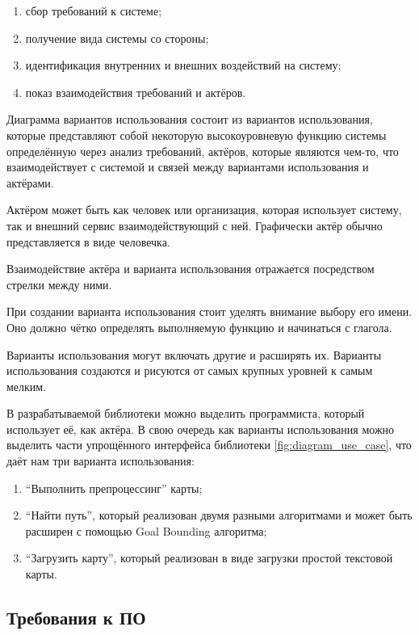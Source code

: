 \begin{enumerate}
	\item сбор требований к системе;
	\item получение вида системы со стороны;
	\item идентификация внутренних и внешних воздействий на систему;
	\item показ взаимодействия требований и актёров.
\end{enumerate}

Диаграмма вариантов использования состоит из вариантов использования, которые представляют собой некоторую высокоуровневую функцию системы определённую через анализ требований, актёров, которые являются чем-то, что взаимодействует с системой и связей между вариантами использования и актёрами.

Актёром может быть как человек или организация, которая использует систему, так и внешний сервис взаимодействующий с ней. Графически актёр обычно представляется в виде человечка.

Взаимодействие актёра и варианта использования отражается посредством стрелки между ними.

При создании варианта использования стоит уделять внимание выбору его имени. Оно должно чётко определять выполняемую функцию и начинаться с глагола. 

Варианты использования могут включать другие и расширять их. Варианты использования создаются и рисуются от самых крупных уровней к самым мелким.

В разрабатываемой библиотеки можно выделить программиста, который использует её, как актёра. В свою очередь как варианты использования можно выделить части упрощённого интерфейса библиотеки \cref{fig:diagram_use_case}, что даёт нам три варианта использования: 


\begin{enumerate}
	\item ``Выполнить препроцессинг'' карты;
	\item ``Найти путь'', который реализован двумя разными алгоритмами и может быть расширен с помощью Goal Bounding алгоритма;
	\item ``Загрузить карту'', который реализован в виде загрузки простой текстовой карты.
\end{enumerate}



\subsection{Требования к ПО}

